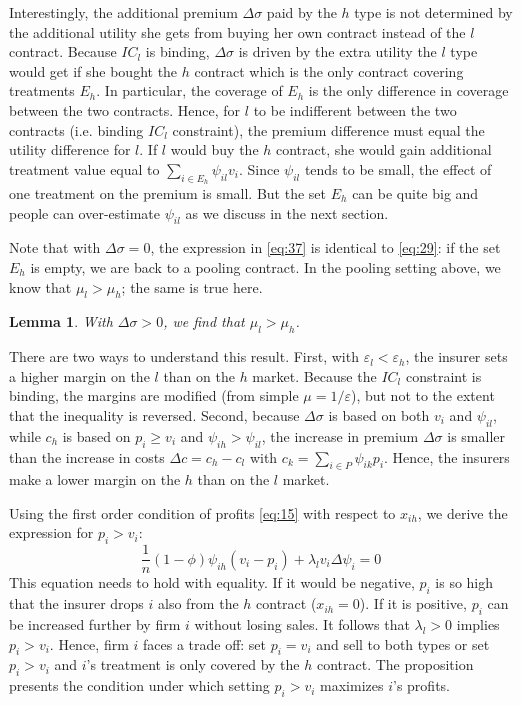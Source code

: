 \documentclass[12pt,english,a4paper]{article}
\newtheorem{lemma}{Lemma}
\begin{document}
Interestingly, the additional premium \(\Delta \sigma\) paid by the \(h\) type is not determined by the additional utility she gets from buying her own contract instead of the \(l\) contract. Because \(IC_l\) is binding, \(\Delta \sigma\) is driven by the extra utility the \(l\) type would get if she bought the \(h\) contract which is the only contract covering treatments \(E_h\). In particular, the coverage of \(E_h\) is the only difference in coverage between the two contracts. Hence, for \(l\) to be indifferent between the two contracts (i.e. binding \(IC_l\) constraint), the premium difference must equal the utility difference for \(l\). If \(l\) would buy the \(h\) contract, she would gain additional treatment value equal to \(\sum_{i \in E_h} \psi_{il} v_i\). Since \(\psi_{il}\) tends to be small, the effect of one treatment on the premium is small. But the set \(E_h\) can be quite big and people can over-estimate \(\psi_{il}\) as we discuss in the next section.

Note that with \(\Delta \sigma =0\), the expression in \eqref{eq:37} is identical to \eqref{eq:29}: if the set \(E_h\) is empty, we are back to a pooling contract. In the pooling setting above, we know that \(\mu_l>\mu_h\); the same is true here.

\begin{lemma}
\label{Linear_pricing_profit_margins}
With \(\Delta \sigma > 0\), we find that \(\mu_l > \mu_h\).
\end{lemma}

There are two ways to understand this result. First, with \(\varepsilon_l < \varepsilon_h\), the insurer sets a higher margin on the \(l\) than on the \(h\) market. Because the \(IC_l\) constraint is binding, the margins are modified (from simple \(\mu=1/\varepsilon\)), but not to the extent that the inequality is reversed. Second, because \(\Delta \sigma\) is based on both \(v_i\) and \(\psi_{il}\), while \(c_h\) is based on \(p_i \geq v_i\) and \(\psi_{ih} > \psi_{il}\), the increase in premium \(\Delta \sigma\) is smaller than the increase in costs \(\Delta c = c_h - c_l\) with \(c_k = \sum_{i \in P} \psi_{ik} p_i\). Hence, the insurers make a lower margin on the \(h\) than on the \(l\) market.

Using the first order condition of profits \eqref{eq:15} with respect to \(x_{ih}\), we derive the expression for \(p_i>v_i\):
\begin{equation}
\label{eq:55}
\frac{1}{n}(1-\phi)\psi_{ih}(v_i-p_i) + \lambda_l v_i \Delta \psi_i = 0
\end{equation}
This equation needs to hold with equality. If it would be negative, \(p_i\) is so high that the insurer drops \(i\) also from the \(h\) contract (\(x_{ih}=0\)). If it is positive, \(p_i\) can be increased further by firm \(i\) without losing sales. It follows that \(\lambda_l>0\) implies \(p_i>v_i\). Hence, firm \(i\) faces a trade off: set \(p_i=v_i\) and sell to both types or set \(p_i>v_i\) and \(i\)'s treatment is only covered by the \(h\) contract. The proposition presents the condition under which setting \(p_i>v_i\) maximizes \(i\)'s profits.
\end{document}
